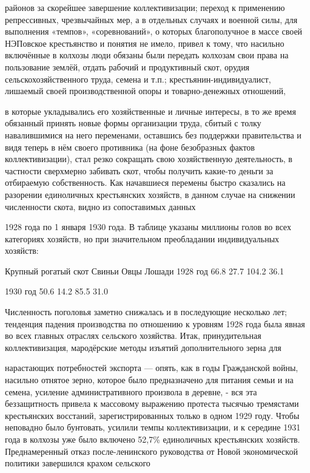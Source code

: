 \label{116-1}
районов за скорейшее завершение коллективизации; переход к применению репрессивных, чрезвычайных мер, а в отдельных случаях и военной силы, для выполнения «темпов», «соревнований», о которых благополучное в массе своей НЭПовское крестьянство и понятия не имело, привел к тому, что насильно включённые в колхозы люди обязаны были передать колхозам свои права на пользование землёй, отдать рабочий и продуктивный скот, орудия сельскохозяйственного труда, семена и т.п.; крестьянин-индивидуалист, лишаемый своей производственной опоры и товарно-денежных отношений,

\label{117-1}
в которые укладывались его хозяйственные и личные интересы, в то же время обязанный принять новые формы организации труда, сбитый с толку навалившимися на него переменами, оставшись без поддержки правительства и видя теперь в нём своего противника (на фоне безобразных фактов коллективизации), стал резко сокращать свою хозяйственную деятельность, в частности сверхмерно забивать скот, чтобы получить какие-то деньги за отбираемую собственность. Как начавшиеся перемены быстро сказались на разорении единоличных крестьянских хозяйств, в данном случае на снижении численности скота, видно из сопоставимых данных

\label{118-1}
1928 года по 1 января 1930 года. В таблице указаны миллионы голов во всех категориях хозяйств, но при значительном преобладании индивидуальных хозяйств:

          Крупный рогатый скот Свиньи Овцы   Лошади
 1928 год    66.8               27.7  104.2  36.1

 1930 год  50.6                 14.2  85.5   31.0

Численность поголовья заметно снижалась и в последующие несколько лет; тенденция падения производства по отношению к уровням 1928 года была явная во всех главных отраслях сельского хозяйства. Итак, принудительная коллективизация, мародёрские методы изъятий дополнительного зерна для

\label{119-1}
нарастающих потребностей экспорта — опять, как в годы Гражданской войны, насильно отнятое зерно, которое было предназначено для питания семьи и на семена, усиление административного произвола в деревне, - вся эта беззащитность привела к массовому выражению протеста тысячью тремястами крестьянских восстаний, зарегистрированных только в одном 1929 году. Чтобы неповадно было бунтовать, усилили темпы коллективизации, и к середине 1931 года в колхозы уже было включено 52,7\% единоличных крестьянских хозяйств. Преднамеренный отказ после-ленинского руководства от Новой экономической политики завершился крахом сельского 

